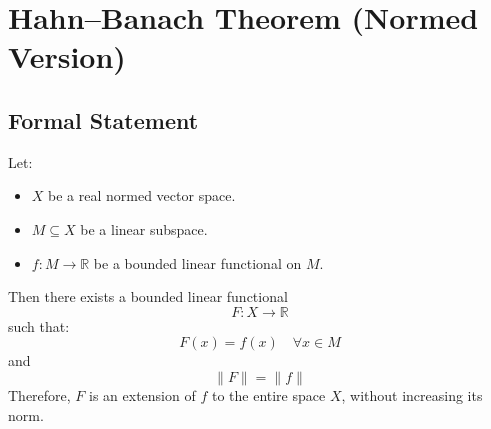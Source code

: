 \documentclass{article}
\begin{document}
\section*{Hahn--Banach Theorem (Normed Version)}

\subsection*{Formal Statement}

Let:
\begin{itemize}
    \item \( X \) be a real normed vector space.
    \item \( M \subseteq X \) be a linear subspace.
    \item \( f : M \to \mathbb{R} \) be a bounded linear functional on \( M \).
\end{itemize}

Then there exists a bounded linear functional
\[
F : X \to \mathbb{R}
\]
such that:
\[
F(x) = f(x) \quad \forall x \in M
\]
and
\[
\| F \| = \| f \|
\]
Therefore, \( F \) is an extension of \( f \) to the entire space \( X \), without increasing its norm.
\end{document}
